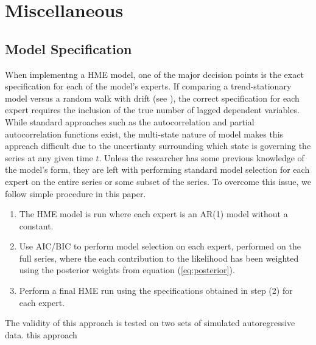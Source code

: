\documentclass[12pt]{article}
\begin{document}
\section{Miscellaneous}



\subsection{Model Specification}
When implementng a HME model, one of the major decision points is the exact specification for each of the model's experts. If comparing a trend-stationary model versus a random walk with drift (see \cite{HuertaJiangTanner2003}), the correct specification for each expert requires the inclusion of the true number of lagged dependent variables. While standard approaches such as the autocorrelation and partial autocorrelation functions exist, the multi-state nature of model makes this appreach difficult due to the uncertianty surrounding which state is governing the series at any given time $t$. Unless the researcher has some previous knowledge of the model's form, they are left with performing standard model selection for each expert on the entire series or some subset of the series. To overcome this issue, we follow simple procedure in this paper.

\begin{enumerate}
\item The HME model is run where each expert is an AR(1) model without a constant.
\item Use AIC/BIC to perform model selection on each expert, performed on the full series, where the each contribution to the likelihood has been weighted using the posterior weights from equation (\ref{eq:posterior}).
\item Perform a final HME run using the specifications obtained in step (2) for each expert.
\end{enumerate}

The validity of this approach is tested on two sets of simulated autoregressive data. this approach
\end{document}
